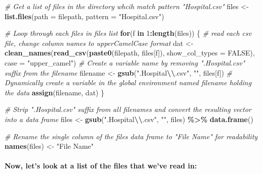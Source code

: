 \documentclass[
]{article}
\newenvironment{Shaded}{\begin{snugshade}}{\end{snugshade}}
\newcommand{\AttributeTok}[1]{\textcolor[rgb]{0.13,0.29,0.53}{#1}}
\newcommand{\CommentTok}[1]{\textcolor[rgb]{0.56,0.35,0.01}{\textit{#1}}}
\newcommand{\ConstantTok}[1]{\textcolor[rgb]{0.56,0.35,0.01}{#1}}
\newcommand{\ControlFlowTok}[1]{\textcolor[rgb]{0.13,0.29,0.53}{\textbf{#1}}}
\newcommand{\DecValTok}[1]{\textcolor[rgb]{0.00,0.00,0.81}{#1}}
\newcommand{\FunctionTok}[1]{\textcolor[rgb]{0.13,0.29,0.53}{\textbf{#1}}}
\newcommand{\NormalTok}[1]{#1}
\newcommand{\OtherTok}[1]{\textcolor[rgb]{0.56,0.35,0.01}{#1}}
\newcommand{\SpecialCharTok}[1]{\textcolor[rgb]{0.81,0.36,0.00}{\textbf{#1}}}
\newcommand{\StringTok}[1]{\textcolor[rgb]{0.31,0.60,0.02}{#1}}
\begin{document}
\begin{Shaded}
\begin{Highlighting}[]
\CommentTok{\# Get a list of files in the directory whcih match pattern "Hospital.csv"}
\NormalTok{files }\OtherTok{\textless{}{-}} \FunctionTok{list.files}\NormalTok{(}\AttributeTok{path =}\NormalTok{ filepath, }\AttributeTok{pattern =} \StringTok{"Hospital.csv"}\NormalTok{)}

\CommentTok{\# Loop through each files in files list}
\ControlFlowTok{for}\NormalTok{(f }\ControlFlowTok{in} \DecValTok{1}\SpecialCharTok{:}\FunctionTok{length}\NormalTok{(files)) \{}
    \CommentTok{\# read each csv file, change column names to upperCamelCase format}
\NormalTok{    dat }\OtherTok{\textless{}{-}} \FunctionTok{clean\_names}\NormalTok{(}\FunctionTok{read\_csv}\NormalTok{(}\FunctionTok{paste0}\NormalTok{(filepath, files[f]),}
                                \AttributeTok{show\_col\_types =} \ConstantTok{FALSE}\NormalTok{), }
                       \AttributeTok{case =} \StringTok{"upper\_camel"}\NormalTok{)}
    \CommentTok{\# Create a variable name by removing ".Hospital.csv" suffix from the filename}
\NormalTok{    filename }\OtherTok{\textless{}{-}} \FunctionTok{gsub}\NormalTok{(}\StringTok{".Hospital}\SpecialCharTok{\textbackslash{}\textbackslash{}}\StringTok{.csv"}\NormalTok{, }\StringTok{""}\NormalTok{, files[f])}
    \CommentTok{\# Dynamically create a variable in the global environment named \textquotesingle{}filename\textquotesingle{} holding the data}
    \FunctionTok{assign}\NormalTok{(filename, dat)}
\NormalTok{\}}

\CommentTok{\# Strip ".Hospital.csv" suffix from all filenames and convert the resulting vector into a data frame}
\NormalTok{files }\OtherTok{\textless{}{-}} \FunctionTok{gsub}\NormalTok{(}\StringTok{".Hospital}\SpecialCharTok{\textbackslash{}\textbackslash{}}\StringTok{.csv"}\NormalTok{, }\StringTok{""}\NormalTok{, files) }\SpecialCharTok{\%\textgreater{}\%} \FunctionTok{data.frame}\NormalTok{()}

\CommentTok{\# Rename the single column of the \textquotesingle{}files\textquotesingle{} data frame to "File Name" for readability}
\FunctionTok{names}\NormalTok{(files) }\OtherTok{\textless{}{-}} \StringTok{"File Name"}
\end{Highlighting}
\end{Shaded}

\paragraph{Now, let's look at a list of the files that we've read
in:}\label{now-lets-look-at-a-list-of-the-files-that-weve-read-in}
\end{document}
